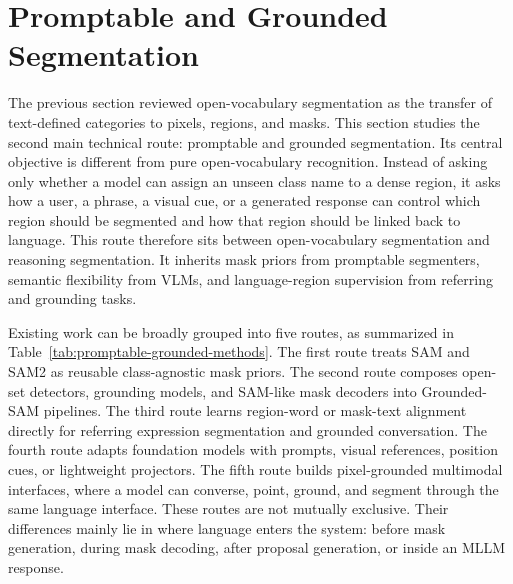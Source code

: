 \section{Promptable and Grounded Segmentation}
\label{sec:promptable-grounded-segmentation}

The previous section reviewed open-vocabulary segmentation as the transfer of text-defined categories to pixels, regions, and masks. This section studies the second main technical route: promptable and grounded segmentation. Its central objective is different from pure open-vocabulary recognition. Instead of asking only whether a model can assign an unseen class name to a dense region, it asks how a user, a phrase, a visual cue, or a generated response can control which region should be segmented and how that region should be linked back to language. This route therefore sits between open-vocabulary segmentation and reasoning segmentation. It inherits mask priors from promptable segmenters, semantic flexibility from VLMs, and language-region supervision from referring and grounding tasks.

Existing work can be broadly grouped into five routes, as summarized in Table~\ref{tab:promptable-grounded-methods}. The first route treats SAM and SAM2 as reusable class-agnostic mask priors. The second route composes open-set detectors, grounding models, and SAM-like mask decoders into Grounded-SAM pipelines. The third route learns region-word or mask-text alignment directly for referring expression segmentation and grounded conversation. The fourth route adapts foundation models with prompts, visual references, position cues, or lightweight projectors. The fifth route builds pixel-grounded multimodal interfaces, where a model can converse, point, ground, and segment through the same language interface. These routes are not mutually exclusive. Their differences mainly lie in where language enters the system: before mask generation, during mask decoding, after proposal generation, or inside an MLLM response.

